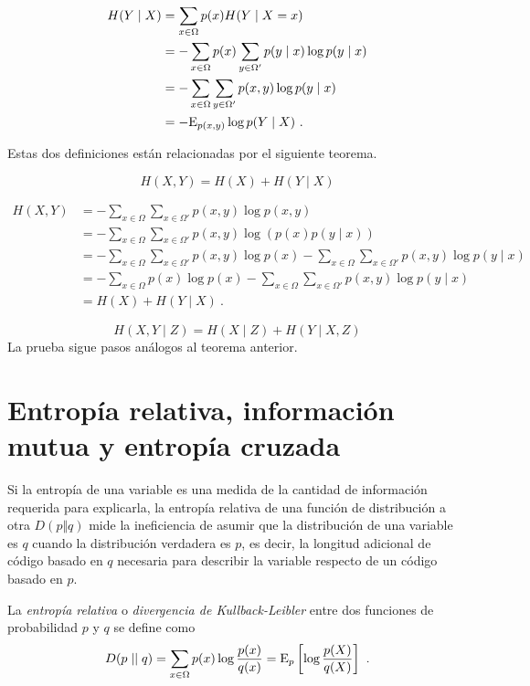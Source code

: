 \begin{align}
  H(Y\mid X) &= \sum_{x\in\Omega}p(x)H(Y\mid X=x)\\
             &= -\sum_{x\in\Omega}p(x)\sum_{y\in\Omega'}p(y\mid x) \log p(y \mid x)\\
             &= -\sum_{x\in\Omega}\sum_{y\in\Omega'}p(x,y) \log p(y \mid x)\\
             &= -\mathrm{E}_{p(x,y)} \log p(Y \mid X)~.
\end{align}


Estas dos definiciones están relacionadas por el siguiente teorema.

\[H(X,Y)=H(X)+H(Y\mid X)\]

\proofb

\begin{align*}
  H(X,Y)&=-\sum_{x\in\Omega}\sum_{x\in\Omega'}p(x,y)\log p(x,y)\\
        &=-\sum_{x\in\Omega}\sum_{x\in\Omega'}p(x,y)\log\left(p(x)p(y\mid x)\right)\\
        &=-\sum_{x\in\Omega}\sum_{x\in\Omega'}p(x,y)\log p(x) - \sum_{x\in\Omega}\sum_{x\in\Omega'}p(x,y)\log p(y\mid x)\\
        &=-\sum_{x\in\Omega}p(x)\log p(x) - \sum_{x\in\Omega}\sum_{x\in\Omega'}p(x,y)\log p(y\mid x)\\
        &=H(X)+H(Y\mid X)~.
\end{align*}

\proofe
\theoe

\corb
\[H(X,Y\mid Z)=H(X\mid Z)+H(Y\mid X,Z)\] \proofb
La prueba sigue pasos análogos al teorema anterior. \proofe
\core

\section{Entropía relativa, información mutua y entropía
cruzada}\label{entropuxeda-relativa-informaciuxf3n-mutua-y-entropuxeda-cruzada}

Si la entropía de una variable es una medida de la cantidad de
información requerida para explicarla, la entropía relativa de una
función de distribución a otra \(D(p\Vert q)\) mide la ineficiencia de
asumir que la distribución de una variable es \(q\) cuando la
distribución verdadera es \(p\), es decir, la longitud adicional de
código basado en \(q\) necesaria para describir la variable respecto de
un código basado en \(p\).

La \emph{entropía relativa} o \emph{divergencia de Kullback-Leibler}
entre dos funciones de probabilidad \(p\) y \(q\) se define como
\[D(p\mid\mid q)=\sum_{x\in\Omega}p(x)\log\frac{p(x)}{q(x)}=\mathrm{E}_{p}\left[\log\frac{p(X)}{q(X)}\right]~.\]


